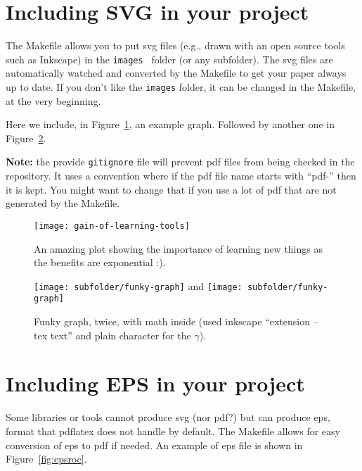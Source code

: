 \section{Including SVG in your project}
\label{svg}
The Makefile allows you to put svg files (e.g., drawn with an open source tools such as Inkscape) in the {\tt images } folder (or any subfolder).
The svg files are automatically watched and converted by the Makefile to get your paper always up to date.
If you don't like the {\tt images} folder, it can be changed in the Makefile, at the very beginning.

Here we include, in Figure~\ref{fig:gain}, an example graph. Followed by another one in Figure~\ref{fig:funky}.

{\bf Note:} the provide {\tt gitignore} file will prevent pdf files from being checked in the repository.
It uses a convention where if the pdf file name starts with ``pdf-'' then it is kept.
You might want to change that if you use a lot of pdf that are not generated by the Makefile.

\begin{figure}[t]
\begin{center}
\texttt{[image: gain-of-learning-tools]}
\end{center}
\caption{
  An amazing plot showing the importance of learning new things as the benefits are exponential :).
}
\label{fig:gain}
\end{figure}

\begin{figure}[t]
\begin{center}
\texttt{[image: subfolder/funky-graph]}
and
\texttt{[image: subfolder/funky-graph]}
\end{center}
\caption{
  Funky graph, twice, with math inside (used inkscape ``extension -- tex text'' and plain character for the $\gamma$).
}
\label{fig:funky}
\end{figure}

\section{Including EPS in your project}

Some libraries or tools cannot produce svg (nor pdf?) but can produce eps, format that pdflatex does not handle by default.
The Makefile allows for easy conversion of eps to pdf if needed.
An example of eps file is shown in Figure~\ref{fig:epsroc}.

